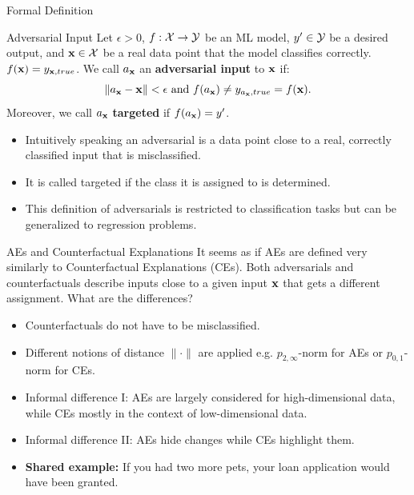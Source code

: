 \documentclass[11pt,compress,t,notes=noshow, xcolor=table]{beamer}
\begin{document}
\begin{vbframe}{Formal Definition}
\begin{block}{Adversarial Input}
Let $\epsilon>0$, $f:\Xspace \rightarrow \Yspace$ be an ML model, $y'\in \Yspace$ be a desired output, and $\xv \in \Xspace$ be a real data point that the model classifies correctly. $f(\xv)=y_{\xv,true}$. We call $a_{\xv}$ an \textbf{adversarial input} to $\xv$ if:
\begin{equation*}
    \| a_{\xv}- \xv\|<\epsilon\text{ and } f(a_{\xv})\neq y_{a_{\xv},true}=f(\xv).
\end{equation*}
Moreover, we call $a_{\xv}$ \textbf{targeted} if $f(a_{\xv})=y'$.
\end{block}
\begin{itemize}
    \item Intuitively speaking an adversarial is a data point close to a real, correctly classified input that is misclassified.
    \item It is called targeted if the class it is assigned to is determined.
    \item This definition of adversarials is restricted to classification tasks but can be generalized to regression problems.
\end{itemize}
\end{vbframe}


\begin{vbframe}{AEs and Counterfactual Explanations}
It seems as if AEs are defined very similarly to Counterfactual Explanations (CEs). Both adversarials and counterfactuals describe inputs close to a given input $\xv$ that gets a different assignment. What are the differences?
\begin{itemize}
    \item Counterfactuals do not have to be misclassified.
    \item Different notions of distance $\|\cdot\|$ are applied e.g. $p_{2,\infty}$-norm for AEs or $p_{0,1}$-norm for CEs.
    \item Informal difference I: AEs are largely considered for high-dimensional data, while CEs mostly in the context of low-dimensional data.
    \item Informal difference II: AEs hide changes while CEs highlight them.
    \item \textbf{Shared example:} If you had two more pets, your loan application would have been granted.
\end{itemize}
\end{vbframe}
\end{document}
